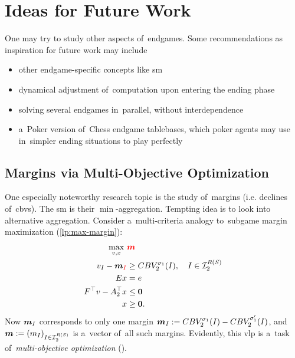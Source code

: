 \chapter{Ideas for Future Work}
One may try to study other aspects of~endgames.
Some recommendations as inspiration for future work may include
\begin{itemize}
  \item other endgame-specific concepts like \acrlong{sm}
  \item dynamical adjustment of~computation upon entering the ending phase
  \item solving several endgames in~parallel, without interdependence
  \item a~Poker version of~Chess endgame tablebases, which poker agents may use in~simpler ending situations to play perfectly
\end{itemize}

\section{Margins via Multi-Objective Optimization}
One especially noteworthy research topic is the study of~margins (i.e. declines of~\acrshort{cbv}s).
The \acrlong{sm} is their $\min$-aggregation.
Tempting idea is to look into alternative aggregation.
Consider a~multi-criteria analogy to~subgame margin maximization (\ref{lp:max-margin}):
\begin{equation}
  \label{vlp:max-margins}
  \begin{split}
    \max_{v, x}\ &\textcolor{red}{\boldsymbol{m}} \\
    v_I - \boldsymbol{m}_{\textcolor{red}{I}} &\ge CBV_2^{\sigma_1}(I), \quad I \in \mathcal{I}_2^{R(S)}\\ 
    Ex &= e \\
    F^\top v - A_2^\top x &\le \boldsymbol{0} \\
    x &\ge \boldsymbol{0}.
  \end{split}
\end{equation}
Now $\boldsymbol{m}_I$ corresponds to only one margin $\boldsymbol{m}_I := CBV_2^{\sigma_1} (I) - CBV_2^{\sigma_1'} (I)$, and $\boldsymbol{m} := (m_I) _{I\in\mathcal{I}_2^{R(S)}}$ is a~vector of~all such margins.
Evidently, this \acrfull{vlp} is a~task of~\emph{multi-objective optimization} (\cite{Ehrgott2006multicriteria, Grygarova1996zaklady}).

